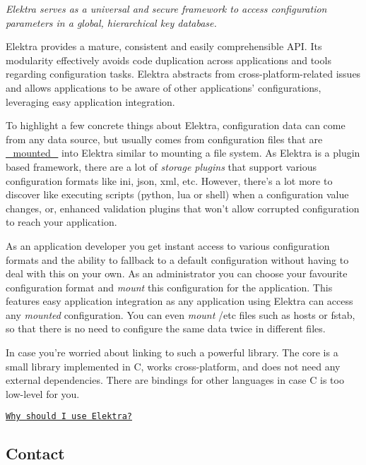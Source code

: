 {\itshape Elektra serves as a universal and secure framework to access configuration parameters in a global, hierarchical key database.}



Elektra provides a mature, consistent and easily comprehensible A\+P\+I. Its modularity effectively avoids code duplication across applications and tools regarding configuration tasks. Elektra abstracts from cross-\/platform-\/related issues and allows applications to be aware of other applications' configurations, leveraging easy application integration.

To highlight a few concrete things about Elektra, configuration data can come from any data source, but usually comes from configuration files that are \hyperlink{md_doc_help_elektra-mounting_doc_help_elektra-mounting_md}{\+\_\+mounted\+\_\+} into Elektra similar to mounting a file system. As Elektra is a plugin based framework, there are a lot of {\itshape storage plugins} that support various configuration formats like ini, json, xml, etc. However, there's a lot more to discover like executing scripts ({\ttfamily python}, {\ttfamily lua} or {\ttfamily shell}) when a configuration value changes, or, enhanced validation plugins that won't allow corrupted configuration to reach your application.

As an application developer you get instant access to various configuration formats and the ability to fallback to a default configuration without having to deal with this on your own. As an administrator you can choose your favourite configuration format and {\itshape mount} this configuration for the application. This features easy application integration as any application using Elektra can access any {\itshape mounted} configuration. You can even {\itshape mount} {\ttfamily /etc} files such as {\ttfamily hosts} or {\ttfamily fstab}, so that there is no need to configure the same data twice in different files.

In case you're worried about linking to such a powerful library. The core is a small library implemented in C, works cross-\/platform, and does not need any external dependencies. There are bindings for other languages in case C is too low-\/level for you.

\href{#goals}{\tt Why should I use Elektra?}

\subsection*{Contact}


